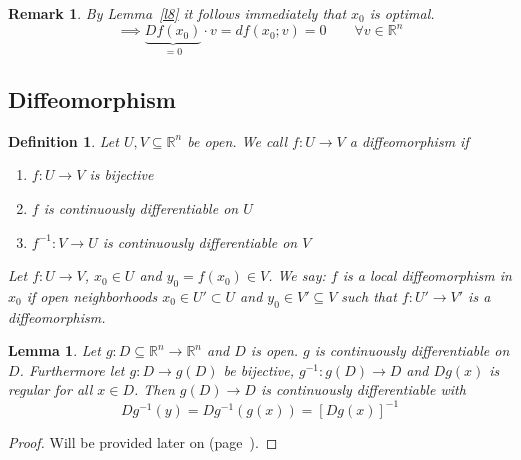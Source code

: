 \documentclass{article}
\newtheorem{definition}{Definition}  \numberwithin{definition}{section}
\newtheorem{lemma}{Lemma}  \numberwithin{lemma}{section}
\newtheorem{remark}{Remark}  \numberwithin{remark}{section}
\begin{document}
\begin{remark}
  By Lemma~\ref{l8} it follows immediately that $x_0$ is optimal.
  \[ \implies \underbrace{Df(x_0)}_{= 0} \cdot v = df(x_0; v) = 0 \qquad \forall v \in \mathbb R^n \]
\end{remark}

\subsection{Diffeomorphism}
\begin{definition} %
  Let $U, V \subseteq \mathbb R^n$ be open.
  We call $f: U \to V$ a \emph{diffeomorphism} if
  \begin{enumerate}
    \item $f: U \to V$ is bijective
    \item $f$ is continuously differentiable on $U$
    \item $f^{-1}: V \to U$ is continuously differentiable on $V$
  \end{enumerate}
  Let $f: U \to V$, $x_0 \in U$ and $y_0 = f(x_0) \in V$.
  We say: $f$ is a local diffeomorphism in $x_0$ if open neighborhoods $x_0 \in U' \subset U$ and $y_0 \in V' \subseteq V$ such that $f: U' \to V'$ is a diffeomorphism.
\end{definition}

\begin{lemma} %
  \label{l9}
  Let $g: D \subseteq \mathbb R^n \to \mathbb R^n$ and $D$ is open.
  $g$ is continuously differentiable on $D$.
  Furthermore let $g: D \to g(D)$ be bijective, $g^{-1}: g(D) \to D$ and $Dg(x)$ is regular for all $x \in D$.
  Then $g(D) \to D$ is continuously differentiable with
  \[ D g^{-1}(y) = Dg^{-1}\left(g(x)\right) = [Dg(x)]^{-1} \]
\end{lemma}

\begin{proof}
  Will be provided later on (page~\pageref{proof:f9}).
\end{proof}
\end{document}

